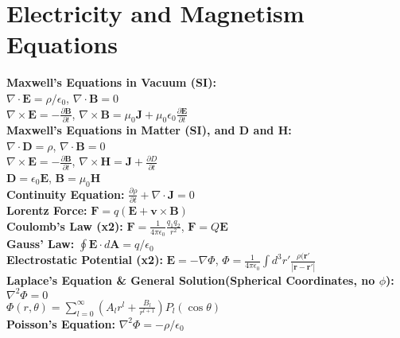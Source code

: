 \documentclass[12pt]{extarticle}
\newcommand{\E}{\mathbf{E}}
\newcommand{\B}{\mathbf{B}}
\newcommand{\D}{\mathbf{D}}
\renewcommand{\H}{\mathbf{H}}
\newcommand{\A}{\mathbf{A}}
\newcommand{\J}{\mathbf{J}}
\newcommand{\F}{\mathbf{F}}
\renewcommand{\r}{\mathbf{r}}
\newcommand{\wavr}{\left|\r-\r'\right|}
\begin{document}
\section{Electricity and Magnetism Equations}
\textbf{Maxwell's Equations in Vacuum (SI):} \\
$\nabla \cdot \E = \rho/\epsilon_0$, $\nabla \cdot \B = 0$ \\
$\nabla \times \E = -\frac{\partial \B}{\partial t}$, $\nabla \times \B = \mu_0\J + \mu_0\epsilon_0\frac{\partial \E}{\partial t}$ \\
\textbf{Maxwell's Equations in Matter (SI), and $\D$ and $\H$:} \\
$\nabla \cdot \D = \rho$, $\nabla \cdot \B = 0$ \\
$\nabla \times \E = -\frac{\partial \B}{\partial t}$, $\nabla \times \H = \J + \frac{\partial D}{\partial t}$ \\
$\D = \epsilon_0\E$, $\B = \mu_0\H$ \\
\textbf{Continuity Equation:} $\frac{\partial \rho}{\partial t}+\nabla\cdot\J = 0$ \\ 
\textbf{Lorentz Force:} $\F = q(\E+\mathbf{v}\times\B)$ \\
\textbf{Coulomb's Law (x2):} $\F = \frac{1}{4\pi\epsilon_0}\frac{q_1q_2}{r^2}$, $\F=Q\E$ \\
\textbf{Gauss' Law:} $\oint \E\cdot d\A = q/\epsilon_0$ \\
\textbf{Electrostatic Potential (x2):} $\E = -\nabla\Phi$, $\Phi = \frac{1}{4\pi\epsilon_0} \int d^3r' \frac{\rho(\r'}{\wavr}$ \\
\textbf{Laplace's Equation \& General Solution(Spherical Coordinates, no $\phi$):} $\nabla^2\Phi = 0$ \\
$\Phi(r,\theta) = \sum\limits_{l=0}^\infty \left( A_lr^l+\frac{B_l}{r^{l+1}} \right) P_l(\cos\theta)$ \\
\textbf{Poisson's Equation:} $\nabla^2\Phi = -\rho/\epsilon_0$ \\
\end{document}
